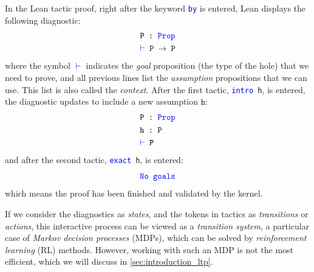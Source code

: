 \documentclass[twoside]{report}
\begin{document}
\begin{example}
    In the Lean tactic proof, right after the keyword \texttt{\textcolor{blue}{by}} is entered, Lean displays the following diagnostic:
    $$
        \begin{aligned}
        &\texttt{P :\ \textcolor{blue}{Prop}} \\
        &\texttt{\textcolor{blue}{$\vdash$} P $\rightarrow$ P}
        \end{aligned}
    $$
    where the symbol \textcolor{blue}{$\vdash$} indicates the \emph{goal} proposition (the type of the hole) that we need to prove, and all previous lines list the \emph{assumption} propositions that we can use. This list is also called the \emph{context}. After the first tactic, \texttt{\textcolor{blue}{intro} h}, is entered, the diagnostic updates to include a new assumption $\texttt{h}$:
    $$
        \begin{aligned}
        &\texttt{P :\ \textcolor{blue}{Prop}} \\
        &\texttt{h :\ P} \\
        &\texttt{\textcolor{blue}{$\vdash$} P}
        \end{aligned}
    $$
    and after the second tactic, \texttt{\textcolor{blue}{exact} h}, is entered:
    $$
        \texttt{\textcolor{blue}{No goals}}
    $$
    which means the proof has been finished and validated by the kernel.
\end{example}

If we consider the diagnostics as \emph{states}, and the tokens in tactics as \emph{transitions} or \emph{actions}, this interactive process can be viewed as a \emph{transition system}, a particular case of \emph{Markov decision processes} (MDPs), which can be solved by \emph{reinforcement learning} (RL) methods. However, working with such an MDP is not the most efficient, which we will discuss in \cref{sec:introduction_ltp}.

\end{document}

